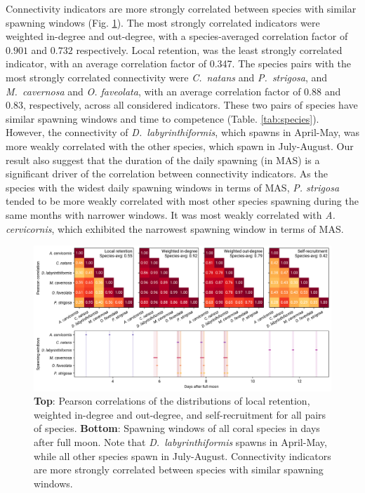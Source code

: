\documentclass[preprint,12pt,authoryear]{elsarticle}
\begin{document}
Connectivity indicators are more strongly correlated between species with similar spawning windows (Fig. \ref{fig:correlation}). The most strongly correlated indicators were weighted in-degree and out-degree, with a species-averaged correlation factor of $0.901$ and $0.732$ respectively. Local retention, was the least strongly correlated indicator, with an average correlation factor of 0.347. The species pairs with the most strongly correlated connectivity were \textit{C.~natans} and \textit{P.~strigosa}, and \textit{M.~cavernosa} and \textit{O. faveolata}, with an average correlation factor of 0.88 and 0.83, respectively, across all considered indicators. These two pairs of species have similar spawning windows and time to competence (Table. \ref{tab:species}). However, the connectivity of \textit{D.~labyrinthiformis}, which spawns in April-May, was more weakly correlated with the other species, which spawn in July-August. Our result also suggest that the duration of the daily spawning (in MAS) is a significant driver of the correlation between connectivity indicators. As the species with the widest daily spawning windows in terms of MAS, \textit{P. strigosa} tended to be more weakly correlated with most other species spawning during the same months with narrower windows. It was most weakly correlated with \textit{A. cervicornis}, which exhibited the narrowest spawning window in terms of MAS.


\begin{figure}
    \centering
    \includegraphics[width=\textwidth]{figures/fig_correlation.png}
    \caption{\textbf{Top}: Pearson correlations of the distributions of local retention, weighted in-degree and out-degree, and self-recruitment for all pairs of species. \textbf{Bottom}: Spawning windows of all coral species in days after full moon. Note that \textit{D.~labyrinthiformis} spawns in April-May, while all other species spawn in July-August. Connectivity indicators are more strongly correlated between species with similar spawning windows.}\label{fig:correlation}
\end{figure}
\end{document}
